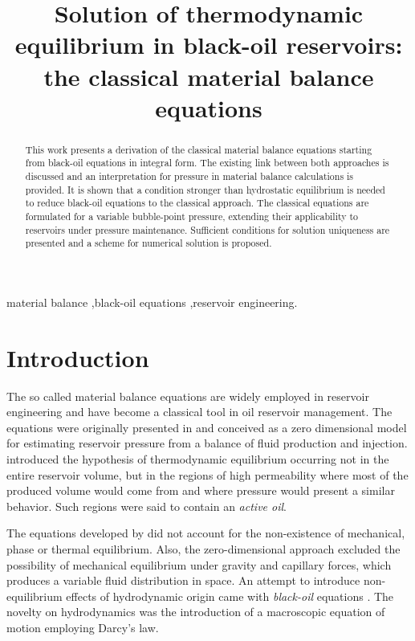 \documentclass[authoryear,preprint,review,12pt]{elsarticle}
\begin{document}
\begin{frontmatter}
\title{Solution of thermodynamic equilibrium in black-oil reservoirs: the classical material balance equations}


\begin{abstract}
This work presents a derivation of the classical material balance equations starting from black-oil equations in integral form. The existing link between both approaches is discussed and an interpretation for pressure in material balance calculations is provided. It is shown that a condition stronger than hydrostatic equilibrium is needed to reduce black-oil equations to the classical approach. The classical equations are formulated for a variable bubble-point pressure, extending their applicability to reservoirs under pressure maintenance. Sufficient conditions for solution uniqueness are presented and a scheme for numerical solution is proposed.
\end{abstract}

\begin{keyword}
material balance \sep black-oil equations \sep reservoir engineering.
\end{keyword}
\end{frontmatter}

\section{Introduction}
The so called material balance equations are widely employed in reservoir engineering and have become a classical tool in oil reservoir management. The equations were originally presented in \cite{schilthuis1936active} and conceived as a zero dimensional model for estimating reservoir pressure from a balance of fluid production and injection. \cite{schilthuis1936active} introduced the hypothesis of thermodynamic equilibrium occurring not in the entire reservoir volume, but in the regions of high permeability where most of the produced volume would come from and where pressure would present a similar behavior. Such regions were said to contain an \textit{active oil}.

The equations developed by \cite{schilthuis1936active} did not account for the non-existence of mechanical, phase or thermal equilibrium. Also, the zero-dimensional approach excluded the possibility of mechanical equilibrium under gravity and capillary forces, which produces a variable fluid distribution in space. An attempt to introduce non-equilibrium effects of hydrodynamic origin came with \textit{black-oil} equations \citep{aziz1979petroleum,blackoil}. The novelty on hydrodynamics was the introduction of a macroscopic equation of motion employing Darcy's law.
\end{document}
